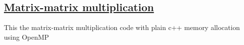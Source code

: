 \subsection*{\href{{https://github.com/CompPhysics/ComputationalPhysicsMSU/blob/master/doc/Programs/ParallelizationOpenMP/OpenMPmatrixmatrixmult.cpp}}{Matrix-matrix multiplication}}
This the matrix-matrix multiplication code with plain c++ memory allocation using OpenMP
















































































